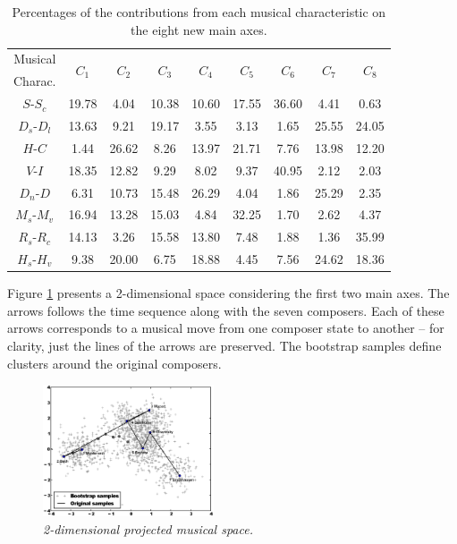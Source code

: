 \documentclass[
 aip,
 jmp,
 amsmath,amssymb,
 reprint,
]{revtex4-1}
\begin{document}
\begin{table}[ht]
\caption{\label{tab:Deviates}Percentages of
the contributions from each musical characteristic on the eight
new main axes.}

\begin{tabular}{|c||c|c|c|c|c|c|c|c|}
\hline
Musical         & \multirow{2}{*}{$C_1$} & \multirow{2}{*}{$C_2$} & \multirow{2}{*}{$C_3$} & \multirow{2}{*}{$C_4$} & \multirow{2}{*}{$C_5$} & \multirow{2}{*}{$C_6$} & \multirow{2}{*}{$C_7$} & \multirow{2}{*}{$C_8$}\\
Charac. & & & & & & & & \\
\hline
 $S$-$S_c$              &  19.78  &   4.04  & 10.38 & 10.60 &  17.55  &  36.60  &  4.41 &  0.63 \\
 $D_s$-$D_l$            &  13.63  &   9.21  & 19.17 &  3.55 &   3.13  &   1.65  & 25.55 & 24.05 \\
 $H$-$C$                &   1.44  &  26.62  & 8.26 & 13.97 &  21.71  &   7.76  & 13.98 & 12.20 \\
 $V$-$I$                &  18.35  &  12.82  & 9.29 &  8.02 &   9.37  &  40.95  &  2.12 &  2.03 \\
 $D_n$-$D$              &   6.31  &  10.73  & 15.48 & 26.29 &  4.04  &   1.86  & 25.29 &  2.35 \\
 $M_s$-$M_v$            &  16.94  &  13.28  & 15.03 &  4.84 &  32.25  &  1.70  &  2.62 &  4.37 \\
 $R_s$-$R_c$            &  14.13  &   3.26  & 15.58 & 13.80 &   7.48  &  1.88  &  1.36 & 35.99 \\
 $H_s$-$H_v$            &   9.38  &  20.00  &  6.75 & 18.88 &   4.45  &  7.56  & 24.62 & 18.36 \\
\hline
\end{tabular}
\end{table}

Figure \ref{fig:pca} presents a 2-dimensional space considering the
first two main axes. The arrows follows the time sequence along with the seven
composers. Each of these arrows corresponds to a musical move from one
composer state to another -- for clarity, just the lines of the arrows
are preserved. The bootstrap
samples define clusters around the original
composers.

\begin{figure}[htbp]
  \begin{center}
    \includegraphics[width=0.45\textwidth]{g1}
  \end{center}
  \caption{\it 2-dimensional projected musical space.}
  \label{fig:pca}
\end{figure}
\end{document}
